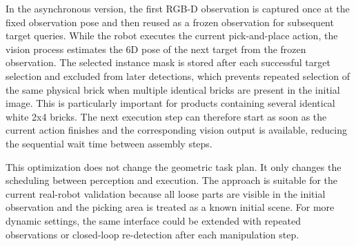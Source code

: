 In the asynchronous version, the first RGB-D observation is captured once at the fixed
observation pose and then reused as a frozen observation for subsequent target queries. While
the robot executes the current pick-and-place action, the vision process estimates the 6D pose
of the next target from the frozen observation. The selected instance mask is stored after each
successful target selection and excluded from later detections, which prevents repeated
selection of the same physical brick when multiple identical bricks are present in the initial
image. This is particularly important for products containing several identical white 2x4
bricks. The next execution step can therefore start as soon as the current action finishes and
the corresponding vision output is available, reducing the sequential wait time between
assembly steps.

This optimization does not change the geometric task plan. It only changes the scheduling
between perception and execution. The approach is suitable for the current real-robot
validation because all loose parts are visible in the initial observation and the picking area is
treated as a known initial scene. For more dynamic settings, the same interface could be
extended with repeated observations or closed-loop re-detection after each manipulation
step.
